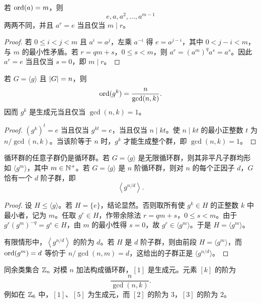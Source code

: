 \begin{theorem}[有限阶元素的不同幂]\label{distinct-powers}
  若 $\operatorname{ord}(a)=m$，则
  \[
  e,a,a^2,\ldots,a^{m-1}
  \]
  两两不同，并且 $a^r=e$ 当且仅当 $m\mid r$。
\end{theorem}

\begin{proof}
  若 $0\le i<j<m$ 且 $a^i=a^j$，左乘 $a^{-i}$ 得 $e=a^{j-i}$，其中 $0<j-i<m$，与 $m$ 的最小性矛盾。若 $r=qm+s$，$0\le s<m$，则 $a^r=(a^m)^q a^s=a^s$。因此 $a^r=e$ 当且仅当 $s=0$，即 $m\mid r$。
\end{proof}

\begin{theorem}[有限循环群中元素的阶]\label{cyclic-order}
  若 $G=\langle g\rangle$ 且 $\lvert G\rvert=n$，则
  \[
  \operatorname{ord}(g^k)=\frac{n}{\gcd(n,k)}.
  \]
  因而 $g^k$ 是生成元当且仅当 $\gcd(n,k)=1$。
\end{theorem}

\begin{proof}
  $(g^k)^t=e$ 当且仅当 $g^{kt}=e$，当且仅当 $n\mid kt$。使 $n\mid kt$ 的最小正整数 $t$ 为 $n/\gcd(n,k)$。当该阶等于 $n$ 时，$g^k$ 才能生成整个群，即 $\gcd(n,k)=1$。
\end{proof}

\begin{theorem}[循环群的子群结构]\label{cyclic-subgroups}
  循环群的任意子群仍是循环群。若 $G=\langle g\rangle$ 是无限循环群，则其非平凡子群均形如 $\langle g^m\rangle$，其中 $m\in\mathbb{N}^+$。若 $G=\langle g\rangle$ 是 $n$ 阶循环群，则对 $n$ 的每个正因子 $d$，$G$ 恰有一个 $d$ 阶子群，即
  \[
  \left\langle g^{n/d}\right\rangle.
  \]
\end{theorem}

\begin{proof}
  设 $H\le \langle g\rangle$。若 $H=\{e\}$，结论显然。否则取所有使 $g^k\in H$ 的正整数 $k$ 中最小者，记为 $m$。任取 $g^r\in H$，作带余除法 $r=qm+s$，$0\le s<m$。由于 $g^r(g^m)^{-q}=g^s\in H$，由 $m$ 的最小性得 $s=0$，故 $g^r\in\langle g^m\rangle$。于是 $H=\langle g^m\rangle$。

  有限情形中，$\left\langle g^{n/d}\right\rangle$ 的阶为 $d$。若 $H$ 是 $d$ 阶子群，则由前段 $H=\langle g^m\rangle$，而 $\operatorname{ord}(g^m)=d$ 等价于 $n/\gcd(n,m)=d$，这给出的子群正是 $\langle g^{n/d}\rangle$。
\end{proof}

\begin{example}[title={模加法群}]\label{zn-add-group}
  同余类集合 $\mathbb{Z}_n$ 对模 $n$ 加法构成循环群，$[1]$ 是生成元。元素 $[k]$ 的阶为
  \[
  \frac{n}{\gcd(n,k)}.
  \]
  例如在 $\mathbb{Z}_6$ 中，$[1]$、$[5]$ 为生成元，而 $[2]$ 的阶为 $3$，$[3]$ 的阶为 $2$。
\end{example}

